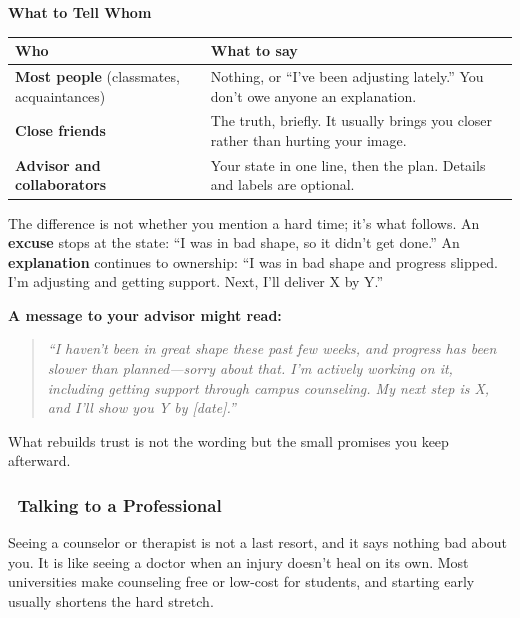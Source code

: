 \documentclass[11pt,a4paper]{article}
\begin{document}
\textbf{What to Tell Whom}

\begin{table}[H]
\centering
\small
\begin{tabular}{@{}p{3.8cm}p{8.8cm}@{}}
\toprule
\textbf{Who} & \textbf{What to say} \\
\midrule
\textbf{Most people} (classmates, acquaintances) & Nothing, or ``I've been adjusting lately.'' You don't owe anyone an explanation. \\
\textbf{Close friends} & The truth, briefly. It usually brings you closer rather than hurting your image. \\
\textbf{Advisor and collaborators} & Your state in one line, then the plan. Details and labels are optional. \\
\bottomrule
\end{tabular}
\end{table}

\begin{tcolorbox}[colback=green!5,colframe=green!50,title={Explanation vs.\ Excuse}]
The difference is not whether you mention a hard time; it's what follows. An \textbf{excuse} stops at the state: ``I was in bad shape, so it didn't get done.'' An \textbf{explanation} continues to ownership: ``I was in bad shape and progress slipped. I'm adjusting and getting support. Next, I'll deliver X by Y.''

\vspace{0.3em}
\textbf{A message to your advisor might read:}
\begin{quote}
\textit{``I haven't been in great shape these past few weeks, and progress has been slower than planned---sorry about that. I'm actively working on it, including getting support through campus counseling. My next step is X, and I'll show you Y by [date].''}
\end{quote}
What rebuilds trust is not the wording but the small promises you keep afterward.
\end{tcolorbox}

\subsubsection{\faHandsHelping~Talking to a Professional}

Seeing a counselor or therapist is not a last resort, and it says nothing bad about you. It is like seeing a doctor when an injury doesn't heal on its own. Most universities make counseling free or low-cost for students, and starting early usually shortens the hard stretch.
\end{document}
